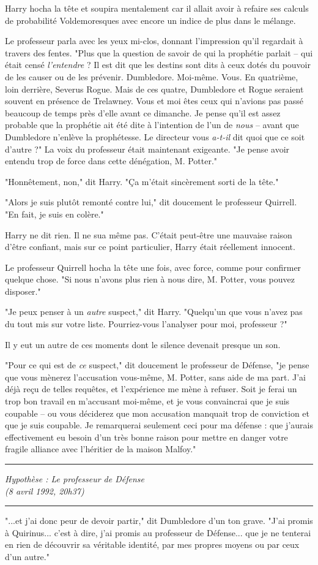 Harry hocha la tête et soupira mentalement car il allait avoir à refaire ses calculs de probabilité Voldemoresques avec encore un indice de plus dans le mélange.

Le professeur parla avec les yeux mi-clos, donnant l'impression qu'il regardait à travers des fentes. "Plus que la question de savoir de qui la prophétie parlait – qui était censé \emph{l'entendre}  ? Il est dit que les destins sont dits à ceux dotés du pouvoir de les causer ou de les prévenir. Dumbledore. Moi-même. Vous. En quatrième, loin derrière, Severus Rogue. Mais de ces quatre, Dumbledore et Rogue seraient souvent en présence de Trelawney. Vous et moi êtes ceux qui n'avions pas passé beaucoup de temps près d'elle avant ce dimanche. Je pense qu'il est assez probable que la prophétie ait été dite à l'intention de l'un de \emph{nous}  – avant que Dumbledore n'enlève la prophétesse. Le directeur vous \emph{a-t-il}  dit quoi que ce soit d'autre ?" La voix du professeur était maintenant exigeante. "Je pense avoir entendu trop de force dans cette dénégation, M. Potter."

"Honnêtement, non," dit Harry. "Ça m'était sincèrement sorti de la tête."

"Alors je suis plutôt remonté contre lui," dit doucement le professeur Quirrell. "En fait, je suis en colère."

Harry ne dit rien. Il ne sua même pas. C'était peut-être une mauvaise raison d'être confiant, mais sur ce point particulier, Harry était réellement innocent.

Le professeur Quirrell hocha la tête une fois, avec force, comme pour confirmer quelque chose. "Si nous n'avons plus rien à nous dire, M. Potter, vous pouvez disposer."

"Je peux penser à un \emph{autre}  suspect," dit Harry. "Quelqu'un que vous n'avez pas du tout mis sur votre liste. Pourriez-vous l'analyser pour moi, professeur ?"

Il y eut un autre de ces moments dont le silence devenait presque un son.

"Pour ce qui est de \emph{ce}  suspect," dit doucement le professeur de Défense, "je pense que vous mènerez l'accusation vous-même, M. Potter, sans aide de ma part. J'ai déjà reçu de telles requêtes, et l'expérience me mène à refuser. Soit je ferai un trop bon travail en m'accusant moi-même, et je vous convaincrai que je suis coupable – ou vous déciderez que mon accusation manquait trop de conviction et que je suis coupable. Je remarquerai seulement ceci pour ma défense : que j'aurais effectivement eu besoin d'un très bonne raison pour mettre en danger votre fragile alliance avec l'héritier de la maison Malfoy."
\par\noindent\rule{\textwidth}{0.4pt}
\emph{Hypothèse : Le professeur de Défense} \\\emph{} \emph{(8 avril 1992, 20h37)} 
\par\noindent\rule{\textwidth}{0.4pt}
"...et j'ai donc peur de devoir partir," dit Dumbledore d'un ton grave. "J'ai promis à Quirinus... c'est à dire, j'ai promis au professeur de Défense... que je ne tenterai en rien de découvrir sa véritable identité, par mes propres moyens ou par ceux d'un autre."

